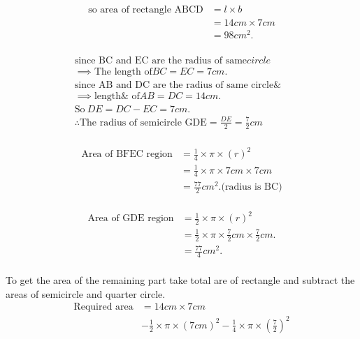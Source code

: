 \documentclass[journal,12pt,twocolumn]{IEEEtran}
\newcommand{\rectarea}[2]{#1 \times #2}
\newcommand{\semicirarea}[1]{\frac{1}{2} \times \pi \times (#1)^2}
\newcommand{\quatercirarea}[1]{\frac{1}{4} \times \pi \times (#1)^2}
\begin{document}
\begin{center}
 \begin{align*}
    \text{so area of rectangle ABCD}&= \rectarea{l}{b} \\
                 &= \rectarea{14cm}{7cm} \\
                 &= 98cm^2.\\
  \end{align*}
\end{center}
\columnbreak

  \begin{center}
  \begin{align*}
        \text{since BC and EC are the radius of same} circle&\\
    \implies \text{The length of} BC = EC = 7cm.&\\
        \text{since AB and DC are the radius of same circle&}\\
    \implies \text{length& of}AB = DC = 14cm.& \\ 
                     \text{So}\ DE=DC-EC =7cm.& \\ 
\therefore \text{The radius of semicircle GDE} =\frac{DE}{2}=\frac{7}{2}cm&\\
 \end{align*}
    \end{center}
  
\begin{align*}
\text{Area of BFEC region} &= \quatercirarea{r} \\
&= \frac{1}{4} \times \pi \times 7cm \times 7cm\\ 
               &= \frac{77}{2}cm^2.\text{(radius is BC)}\\
\end{align*}

\begin{align*}
\text{Area of GDE region} &= \semicirarea{r} \\
               &=\frac{1}{2} \times \pi \times \frac{7}{2}cm \times \frac{7}{2}cm.\\
                          &= \frac{77}{4}cm^2.\\
\end{align*}
      
To get the area of the remaining part take total are of rectangle
and subtract the areas of semicircle and quarter circle.
\begin{align*}
    \text{Required area} &= \rectarea{14cm}{7cm} \\
                     &- \semicirarea{7cm} - \quatercirarea{\frac{7}{2}} \\
\end{align*}
\end{document}
